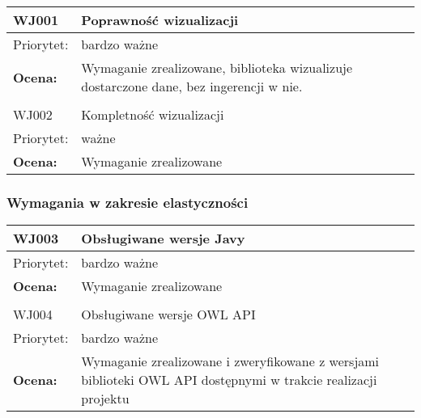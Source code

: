 

\begin{center}

\begin{tabular}{|m{3cm}|m{9cm}|} \hline

WJ001 & Poprawność wizualizacji \\ \hline
Priorytet: & bardzo ważne \\ \hline
\textbf{Ocena:} & Wymaganie zrealizowane, biblioteka wizualizuje dostarczone dane, bez ingerencji w nie.\\ \hline
\multicolumn{2}{c}{} \\
 \hline

WJ002 & Kompletność wizualizacji \\ \hline
Priorytet: & ważne \\ \hline
\textbf{Ocena:} & Wymaganie zrealizowane \\ \hline
\end{tabular}

\end{center}

\subsubsection{Wymagania w zakresie elastyczności}


\begin{center}

\begin{tabular}{|m{3cm}|m{9cm}|} \hline

WJ003 & Obsługiwane wersje Javy \\ \hline
Priorytet: & bardzo ważne \\ \hline
\textbf{Ocena:} & Wymaganie zrealizowane \\ \hline
\multicolumn{2}{c}{} \\
 \hline

WJ004 & Obsługiwane wersje OWL API \\ \hline
Priorytet: & bardzo ważne \\ \hline
\textbf{Ocena:} & Wymaganie zrealizowane i zweryfikowane z wersjami biblioteki OWL API dostępnymi w trakcie realizacji projektu  \\ \hline
\end{tabular}

\end{center}




